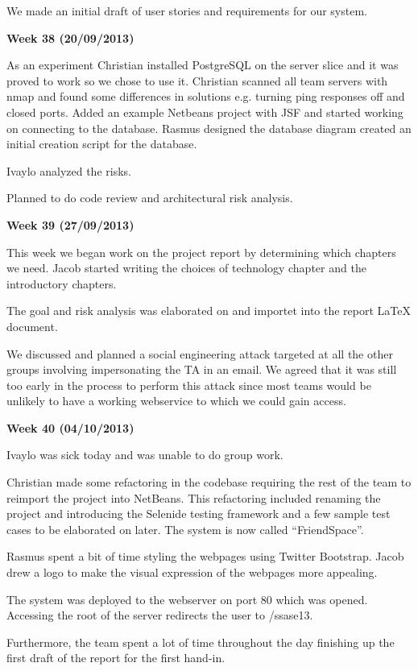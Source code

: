 We made an initial draft of user stories and requirements for our system.


\textbf{Week 38 (20/09/2013)}

As an experiment Christian installed PostgreSQL on the server slice and it was proved to work so we chose to use it. 
Christian scanned all team servers with nmap and found some differences in solutions e.g. turning ping responses off and closed ports.
Added an example Netbeans project with JSF and started working on connecting to the database.
Rasmus designed the database diagram created an initial creation script for the database.

Ivaylo analyzed the risks.

Planned to do code review and architectural risk analysis.


\textbf{Week 39 (27/09/2013)}

This week we began work on the project report by determining which chapters we need. Jacob started writing the choices of technology chapter and the introductory chapters.

The goal and risk analysis was elaborated on and importet into the report LaTeX document.

We discussed and planned a social engineering attack targeted at all the other groups involving impersonating the TA in an email. We agreed that it was still too early in the process to perform this attack since most teams would be unlikely to have a working webservice to which we could gain access.

\textbf{Week 40 (04/10/2013)}

Ivaylo was sick today and was unable to do group work.

Christian made some refactoring in the codebase requiring the rest of the team to reimport the project into NetBeans.
This refactoring included renaming the project and introducing the Selenide testing framework and a few sample test cases to be elaborated on later. The system is now called ``FriendSpace''.

Rasmus spent a bit of time styling the webpages using Twitter Bootstrap. Jacob drew a logo to make the visual expression of the webpages more appealing.

The system was deployed to the webserver on port 80 which was opened. Accessing the root of the server redirects the user to /ssase13.

Furthermore, the team spent a lot of time throughout the day finishing up the first draft of the report for the first hand-in.